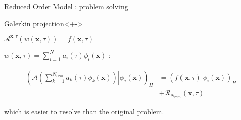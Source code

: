 \begin{frame}{Reduced Order Model : problem solving}
\begin{block}{Galerkin projection}<+->
%
\begin{description}
\item<+-> [For a given problem] $\mathcal{A}^{\mathbf{x},\tau}\left(w(\mathbf{x},\tau)\right)=f(\mathbf{x},\tau)$
\item<+-> [Decomposition] $w(\mathbf{x},\tau)=\sum\limits_{i=1}^N a_i(\tau)\phi_i(\mathbf{x})$ ;%
\item<+-> [The problem in $a_k$] %
\[%
\begin{split}
\left(\left.\mathcal{A}\left(\sum\limits_{k=1}^{N_{rom}} a_k(\tau)\phi_k(\mathbf{x})\right) \right|\phi_i\left(\mathbf{x}\right)\right)_H %
&= \left(f\left(\mathbf{x},\tau\right)|\phi_i(\mathbf{x})\right)_H\\%
&+\mathcal{R}_{N_{rom}}(\mathbf{x},\tau)
\end{split}
\]
\item<+-> [\dots] which is easier to resolve than the original problem.
\end{description}
%
\end{block}
%
\end{frame}

